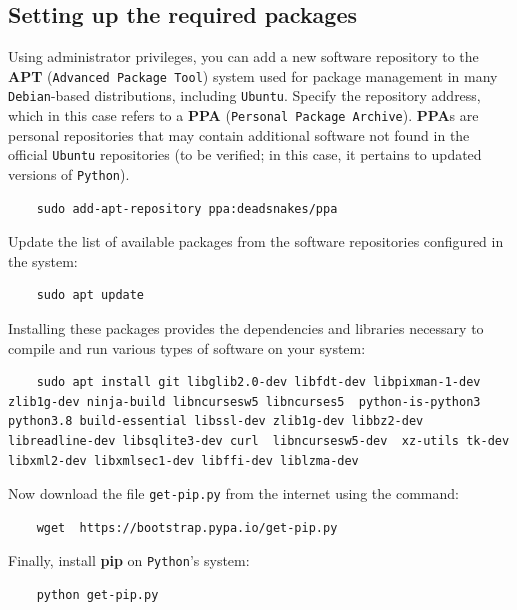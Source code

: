 \documentclass{exam}
\begin{document}
\subsection{Setting up the required packages}\label{1.2}
Using administrator privileges, you can add a new software repository to the \textbf{APT} (\texttt{Advanced Package Tool}) system used for package management in many \texttt{Debian}-based distributions, including \texttt{Ubuntu}. Specify the repository address, which in this case refers to a \textbf{PPA} (\texttt{Personal Package Archive}). \textbf{PPA}s are personal repositories that may contain additional software not found in the official \texttt{Ubuntu} repositories (to be verified; in this case, it pertains to updated versions of \texttt{Python}).
\begin{lstlisting}
    sudo add-apt-repository ppa:deadsnakes/ppa
\end{lstlisting}
Update the list of available packages from the software repositories configured in the system:
\begin{lstlisting}
    sudo apt update
\end{lstlisting}
Installing these packages provides the dependencies and libraries necessary to compile and run various types of software on your system:
\begin{lstlisting}
    sudo apt install git libglib2.0-dev libfdt-dev libpixman-1-dev zlib1g-dev ninja-build libncursesw5 libncurses5  python-is-python3 python3.8 build-essential libssl-dev zlib1g-dev libbz2-dev libreadline-dev libsqlite3-dev curl  libncursesw5-dev  xz-utils tk-dev libxml2-dev libxmlsec1-dev libffi-dev liblzma-dev 
\end{lstlisting}
Now download the file \texttt{get-pip.py} from the internet using the command:
\begin{lstlisting}
    wget  https://bootstrap.pypa.io/get-pip.py
\end{lstlisting}
Finally, install \textbf{pip} on \texttt{Python}'s system:
\begin{lstlisting}
    python get-pip.py
\end{lstlisting}
\end{document}
